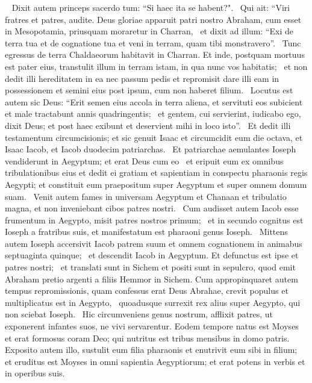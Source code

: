 \begin{biblechapter}   
\verse Dixit autem princeps sacerdo tum: “Si haec ita se habent?".  
\verse Qui ait: “Viri fratres et patres, audite. Deus gloriae apparuit patri nostro Abraham, cum esset in Mesopotamia, priusquam moraretur in Charran,  
\verse et dixit ad illum: “Exi de terra tua et de cognatione tua et veni in terram, quam tibi monstravero”.  
\verse Tunc egressus de terra Chaldaeorum habitavit in Charran. Et inde, postquam mortuus est pater eius, transtulit illum in terram istam, in qua nunc vos habitatis;  
\verse et non dedit illi hereditatem in ea nec passum pedis et repromisit dare illi eam in possessionem et semini eius post ipsum, cum non haberet filium.  
\verse Locutus est autem sic Deus: “Erit semen eius accola in terra aliena, et servituti eos subicient et male tractabunt annis quadringentis;  
\verse et gentem, cui servierint, iudicabo ego, dixit Deus; et post haec exibunt et deservient mihi in loco isto”.  
\verse Et dedit illi testamentum circumcisionis; et sic genuit Isaac et circumcidit eum die octava, et Isaac Iacob, et Iacob duodecim patriarchas.  
\verse Et patriarchae aemulantes Ioseph vendiderunt in Aegyptum; et erat Deus cum eo  
\verse et eripuit eum ex omnibus tribulationibus eius et dedit ei gratiam et sapientiam in conspectu pharaonis regis Aegypti; et constituit eum praepositum super Aegyptum et super omnem domum suam.  
\verse Venit autem fames in universam Aegyptum et Chanaan et tribulatio magna, et non inveniebant cibos patres nostri.  
\verse Cum audisset autem Iacob esse frumentum in Aegypto, misit patres nostros primum;  
\verse et in secundo cognitus est Ioseph a fratribus suis, et manifestatum est pharaoni genus Ioseph.  
\verse Mittens autem Ioseph accersivit Iacob patrem suum et omnem cognationem in animabus septuaginta quinque;  
\verse et descendit Iacob in Aegyptum. Et defunctus est ipse et patres nostri;  
\verse et translati sunt in Sichem et positi sunt in sepulcro, quod emit Abraham pretio argenti a filiis Hemmor in Sichem. 
\verse Cum appropinquaret autem tempus repromissionis, quam confessus erat Deus Abrahae, crevit populus et multiplicatus est in Aegypto,  
\verse quoadusque surrexit rex alius super Aegypto, qui non sciebat Ioseph.  
\verse Hic circumveniens genus nostrum, afflixit patres, ut exponerent infantes suos, ne vivi servarentur.
\verse Eodem tempore natus est Moyses et erat formosus coram Deo; qui nutritus est tribus mensibus in domo patris.  
\verse Exposito autem illo, sustulit eum filia pharaonis et enutrivit eum sibi in filium;  
\verse et eruditus est Moyses in omni sapientia Aegyptiorum; et erat potens in verbis et in operibus suis.  

\end{biblechapter}
